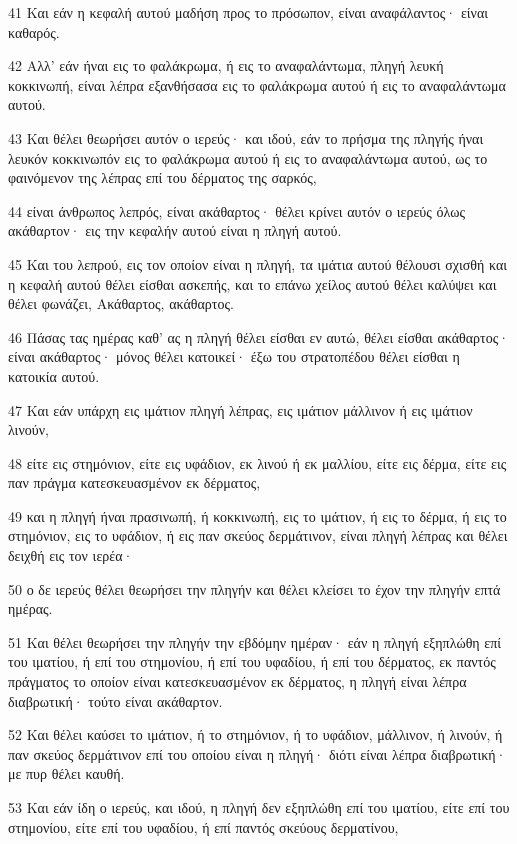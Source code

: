 \par 41 Και εάν η κεφαλή αυτού μαδήση προς το πρόσωπον, είναι αναφάλαντος· είναι καθαρός.
\par 42 Αλλ' εάν ήναι εις το φαλάκρωμα, ή εις το αναφαλάντωμα, πληγή λευκή κοκκινωπή, είναι λέπρα εξανθήσασα εις το φαλάκρωμα αυτού ή εις το αναφαλάντωμα αυτού.
\par 43 Και θέλει θεωρήσει αυτόν ο ιερεύς· και ιδού, εάν το πρήσμα της πληγής ήναι λευκόν κοκκινωπόν εις το φαλάκρωμα αυτού ή εις το αναφαλάντωμα αυτού, ως το φαινόμενον της λέπρας επί του δέρματος της σαρκός,
\par 44 είναι άνθρωπος λεπρός, είναι ακάθαρτος· θέλει κρίνει αυτόν ο ιερεύς όλως ακάθαρτον· εις την κεφαλήν αυτού είναι η πληγή αυτού.
\par 45 Και του λεπρού, εις τον οποίον είναι η πληγή, τα ιμάτια αυτού θέλουσι σχισθή και η κεφαλή αυτού θέλει είσθαι ασκεπής, και το επάνω χείλος αυτού θέλει καλύψει και θέλει φωνάζει, Ακάθαρτος, ακάθαρτος.
\par 46 Πάσας τας ημέρας καθ' ας η πληγή θέλει είσθαι εν αυτώ, θέλει είσθαι ακάθαρτος· είναι ακάθαρτος· μόνος θέλει κατοικεί· έξω του στρατοπέδου θέλει είσθαι η κατοικία αυτού.
\par 47 Και εάν υπάρχη εις ιμάτιον πληγή λέπρας, εις ιμάτιον μάλλινον ή εις ιμάτιον λινούν,
\par 48 είτε εις στημόνιον, είτε εις υφάδιον, εκ λινού ή εκ μαλλίου, είτε εις δέρμα, είτε εις παν πράγμα κατεσκευασμένον εκ δέρματος,
\par 49 και η πληγή ήναι πρασινωπή, ή κοκκινωπή, εις το ιμάτιον, ή εις το δέρμα, ή εις το στημόνιον, εις το υφάδιον, ή εις παν σκεύος δερμάτινον, είναι πληγή λέπρας και θέλει δειχθή εις τον ιερέα·
\par 50 ο δε ιερεύς θέλει θεωρήσει την πληγήν και θέλει κλείσει το έχον την πληγήν επτά ημέρας.
\par 51 Και θέλει θεωρήσει την πληγήν την εβδόμην ημέραν· εάν η πληγή εξηπλώθη επί του ιματίου, ή επί του στημονίου, ή επί του υφαδίου, ή επί του δέρματος, εκ παντός πράγματος το οποίον είναι κατεσκευασμένον εκ δέρματος, η πληγή είναι λέπρα διαβρωτική· τούτο είναι ακάθαρτον.
\par 52 Και θέλει καύσει το ιμάτιον, ή το στημόνιον, ή το υφάδιον, μάλλινον, ή λινούν, ή παν σκεύος δερμάτινον επί του οποίου είναι η πληγή· διότι είναι λέπρα διαβρωτική· με πυρ θέλει καυθή.
\par 53 Και εάν ίδη ο ιερεύς, και ιδού, η πληγή δεν εξηπλώθη επί του ιματίου, είτε επί του στημονίου, είτε επί του υφαδίου, ή επί παντός σκεύους δερματίνου,
